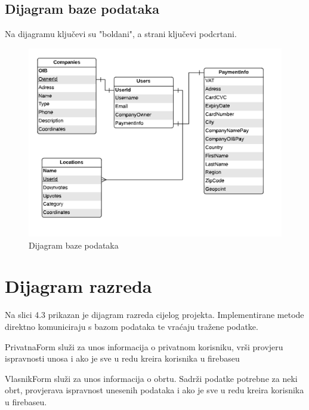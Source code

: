 						  
						  
						  
					  
					  \subsection{Dijagram baze podataka}
						  Na dijagramu ključevi su "boldani", a strani ključevi podcrtani.
						  \begin{figure}[H]
					  \includegraphics[scale=0.9]{slike/Baza.png}
					  \centering
					  \caption{Dijagram baze podataka}
					  \label{fig:promjene}
							\end{figure}
					  
			
		\section{Dijagram razreda}
		
			
			
			Na slici 4.3 prikazan je dijagram razreda cijelog projekta. Implementirane metode direktno komuniciraju s bazom podataka te vraćaju tražene podatke.
			
			PrivatnaForm služi za unos informacija o privatnom korisniku, vrši provjeru ispravnosti unosa i ako je sve u redu kreira korisnika u firebaseu
			
			VlasnikForm služi za unos informacija o obrtu. Sadrži podatke potrebne za neki obrt, provjerava ispravnost unesenih podataka i ako je sve u redu kreira korisnika u firebaseu.
	
